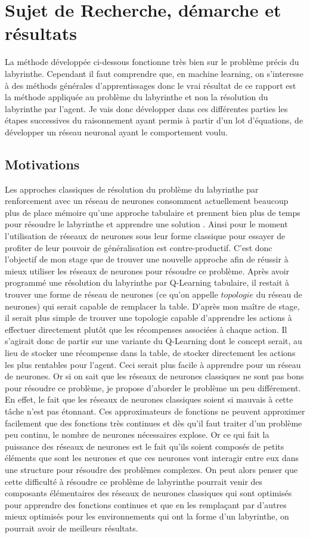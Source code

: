 \documentclass[10pt]{article}
\begin{document}
\section{Sujet de Recherche, démarche et résultats}
La méthode développée ci-dessous fonctionne très bien sur le problème précis du labyrinthe. Cependant il faut comprendre que, en machine learning, on s'interesse à des méthods générales d'apprentissages donc le vrai résultat de ce rapport est la méthode appliquée au problème du labyrinthe et non la résolution du labyrinthe par l'agent. Je vais donc développer dans ces différentes parties les étapes successives du raisonnement ayant permis à partir d'un lot d'équations, de développer un réseau neuronal ayant le comportement voulu.
\subsection{Motivations}
Les approches classiques de résolution du problème du labyrinthe par renforcement avec un réseau de neurones consomment actuellement beaucoup plus de place mémoire qu'une approche tabulaire et prennent bien plus de temps pour résoudre le labyrinthe et apprendre une solution \cite{qmaze}. Ainsi pour le moment l'utilisation de réseaux de neurones sous leur forme classique pour essayer de profiter de leur pouvoir de généralisation est contre-productif. C'est donc l'objectif de mon stage que de trouver une nouvelle approche afin de réussir à mieux utiliser les réseaux de neurones pour résoudre ce problème.
Après avoir programmé une résolution du labyrinthe par Q-Learning tabulaire, il restait à trouver une forme de réseau de neurones (ce qu'on appelle $\textit{topologie}$ du réseau de neurones) qui serait capable de remplacer la table. D'après mon maître de stage, il serait plus simple de trouver une topologie capable d'apprendre les actions à effectuer directement plutôt que les récompenses associées à chaque action. Il s'agirait donc de partir sur une variante du Q-Learning dont le concept serait, au lieu de stocker une récompense dans la table, de stocker directement les actions les plus rentables pour l'agent. Ceci serait plus facile à apprendre pour un réseau de neurones. Or si on sait que les réseaux de neurones classiques ne sont pas bons pour résoudre ce problème, je propose d'aborder le problème un peu différement. En effet, le fait que les réseaux de neurones classiques soient si mauvais à cette tâche n'est pas étonnant. Ces approximateurs de fonctions ne peuvent approximer facilement que des fonctions très continues et dès qu'il faut traiter d'un problème peu continu, le nombre de neurones nécessaires explose. Or ce qui fait la puissance des réseaux de neurones est le fait qu'ils soient composés de petits éléments que sont les neurones et que ces neurones vont interagir entre eux dans une structure pour résoudre des problèmes complexes. On peut alors penser que cette difficulté à résoudre ce problème de labyrinthe pourrait venir des composants élémentaires des réseaux de neurones classiques qui sont optimisés pour apprendre des fonctions continues et que en les remplaçant par d'autres mieux optimisés pour les environnements qui ont la forme d'un labyrinthe, on pourrait avoir de meilleurs résultats.\\
\end{document}
